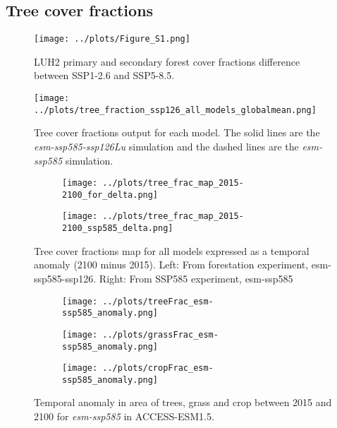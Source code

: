 \documentclass[]{article}
\begin{document}
\subsection{Tree cover fractions}

\begin{figure}[H]
    \centering
    \texttt{[image: ../plots/Figure\_S1.png]}
    \caption{LUH2 primary and secondary forest cover fractions difference between SSP1-2.6 and SSP5-8.5.}
    \label{fig:LUH2DIFF}
\end{figure}

\begin{figure}[H]
    \centering
    \texttt{[image: ../plots/tree\_fraction\_ssp126\_all\_models\_globalmean.png]}
    \caption{Tree cover fractions output for each model. The solid lines are the \textit{esm-ssp585-ssp126Lu} simulation and the dashed lines are the \textit{esm-ssp585} simulation.}
    \label{fig:tree_fractions_models}
\end{figure}

\begin{figure}[H]
    \centering
    \begin{subfigure}[b]{0.4\linewidth}
        \texttt{[image: ../plots/tree\_frac\_map\_2015-2100\_for\_delta.png]}
    \end{subfigure}
    \begin{subfigure}[b]{0.4\linewidth}
        \texttt{[image: ../plots/tree\_frac\_map\_2015-2100\_ssp585\_delta.png]}
    \end{subfigure}
    \caption{Tree cover fractions map for all models expressed as a temporal anomaly (2100 minus 2015). Left: From forestation experiment, esm-ssp585-ssp126. Right: From SSP585 experiment, esm-ssp585}
    \label{fig:tree_area_maps_ssp126Lu}
\end{figure}

\begin{figure}[H]
    \centering
    \begin{subfigure}[b]{0.4\linewidth}
        \texttt{[image: ../plots/treeFrac\_esm-ssp585\_anomaly.png]}
    \end{subfigure}
    \begin{subfigure}[b]{0.4\linewidth}
        \texttt{[image: ../plots/grassFrac\_esm-ssp585\_anomaly.png]}
    \end{subfigure}
    \begin{subfigure}[b]{0.4\linewidth}
        \texttt{[image: ../plots/cropFrac\_esm-ssp585\_anomaly.png]}
    \end{subfigure}
    \caption{Temporal anomaly in area of trees, grass and crop between 2015 and 2100 for \textit{esm-ssp585} in ACCESS-ESM1.5.
    }
    \label{fig:ACCESS_land_cover}
\end{figure}
\end{document}
